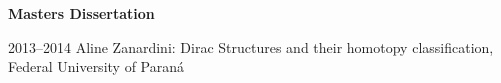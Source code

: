 \documentclass[10pt]{article}
\renewcommand{\section}[2]%
        {\pagebreak[2]\vspace{.2\baselineskip}%
         \phantomsection\addcontentsline{toc}{section}{#1}%
         \hspace{0in}%
         \marginpar{
         \raggedright \scshape #1}#2}
\newenvironment{innerlist}[1][\enskip\textbullet]%
        {\begin{compactitem}[#1]}{\end{compactitem}}
\newcommand{\blankline}{\quad\pagebreak[2]}
\begin{document}
  \blankline
%  
\hspace{-.5cm} \textbf{Masters Dissertation}
  \begin{innerlist}
  	\item[2013--2014] Aline Zanardini: Dirac Structures and their homotopy classification, Federal University of Paraná
  \end{innerlist}
%  
%  
%
%
%
%
%
%
%   	
%   
%	 
%	 
				

\end{document}
